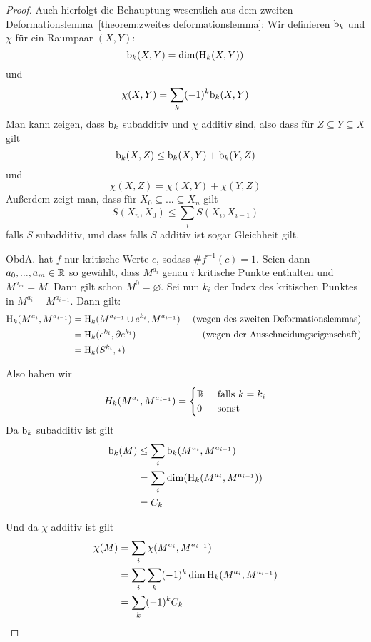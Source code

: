 \begin{proof}
    Auch hierfolgt die Behauptung wesentlich aus dem zweiten 
    Deformationslemma~\ref{theorem:zweites deformationslemma}:
    Wir definieren ${ \operatorname{b} }_k$ und $\chi$ für ein Raumpaar $(X, Y)$:
    \[ { \operatorname{b} }_k(X, Y) = \dim ({ \operatorname{H} }_k (X, Y)) \]
    und 
    \[ \chi(X, Y) = \sum_k (-1)^k { \operatorname{b} }_k(X, Y) \]
    Man kann zeigen, dass ${ \operatorname{b} }_k$ subadditiv und $\chi$ additiv sind, also
    dass für $Z \subseteq Y \subseteq X$ gilt
    \[ { \operatorname{b} }_k(X, Z) \leq { \operatorname{b} }_k(X, Y) + { \operatorname{b} }_k(Y, Z) \]
    und 
    \[ \chi(X, Z) = \chi(X, Y) + \chi(Y, Z) \]
    Außerdem zeigt man, dass für $X_0 \subseteq ... \subseteq X_n$ gilt
    \[ S(X_n, X_0) \leq \sum_i S(X_i, X_{i-1}) \]
    falls $S$ subadditiv, und dass falls $S$ additiv ist sogar Gleichheit gilt.
    
    ObdA. hat $f$ nur kritische Werte $c$, sodass $\#f^{-1}(c) = 1$. Seien dann 
    $a_0, ..., a_m \in { \mathbb R }$ so gewählt, dass $M^{a_i}$ genau $i$ kritische Punkte
    enthalten und $M^{a_m} = M$. Dann gilt schon $M^0 = \varnothing$. Sei nun $k_i$
    der Index des kritischen Punktes in $M^{a_i} - M^{a_{i-1}}$. Dann gilt:
    \begin{align*}
        { \operatorname{H} }_k(M^{a_i}, M^{a_{i-1}}) 
            & = { \operatorname{H} }_k(M^{a_{i-1}} \cup e^{k_i}, M^{a_{i-1}})
            & \text{ (wegen des zweiten Deformationslemmas) } \\
        & = { \operatorname{H} }_k(e^{k_i}, { \partial } e^{k_i})
            & \text{ (wegen der Ausschneidungseigenschaft) } \\
        & = { \operatorname{H} }_k(S^{k_i}, \ast)
    \end{align*}

    Also haben wir
    \[ 
        H_k(M^{a_i}, M^{a_{i-1}}) = \begin{cases}
            { \mathbb R } &\text{ falls } k = k_i \\
            0 & \text{ sonst }
        \end{cases}
    \]
    Da ${ \operatorname{b} }_k$ subadditiv ist gilt 
    \begin{align*}
        { \operatorname{b} }_k(M) 
           & \leq \sum_i { \operatorname{b} }_k(M^{a_i}, M^{a_{i-1}}) \\
           & = \sum_i \dim({ \operatorname{H} }_k(M^{a_i}, M^{a_{i-1}})) \\
           & = C_k
    \end{align*}
    
    Und da $\chi$ additiv ist gilt
    \begin{align*}
        \chi(M) 
           & = \sum_i \chi (M^{a_i}, M^{a_{i-1}}) \\
           & = \sum_i \sum_k (-1)^k \dim { \operatorname{H} }_k (M^{a_i}, M^{a_{i-1}}) \\
           & = \sum_k (-1)^k C_k
    \end{align*}


\end{proof}
